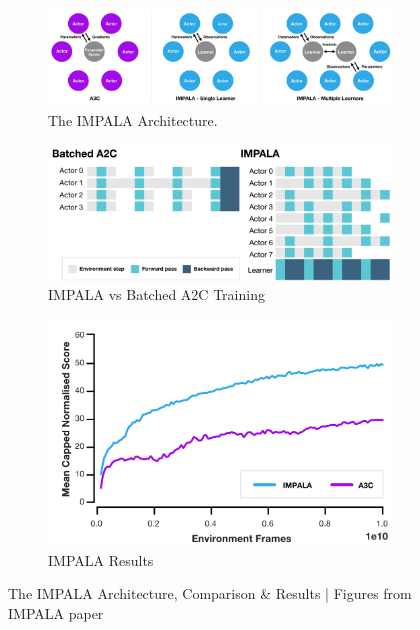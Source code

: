 \begin{figure}[!htb]
	\centering
	\begin{subfigure}[b]{0.45\textwidth}
		\centering
		\includegraphics[width=\textwidth]{figures/algos/impala.png}
		\caption{The IMPALA Architecture.}
		\label{fig:impala_arch}
	\end{subfigure}
	\hfill
	\begin{subfigure}[b]{0.45\textwidth}
		\centering
		\includegraphics[width=\textwidth]{figures/algos/impala_vs_a2c.png}
		\caption{IMPALA vs Batched A2C Training}
		\label{fig:impala_vs_a2c}
	\end{subfigure}
	\hfill

	\begin{subfigure}[b]{0.45\textwidth}
		\centering
		\includegraphics[width=\textwidth]{figures/algos/impala_results.png}
		\caption{IMPALA Results}
		\label{fig:impala_results}
	\end{subfigure}
	\hfill
	\caption{The IMPALA Architecture, Comparison \& Results | Figures from IMPALA paper~\parencite{espeholt2018impala}}
	\label{fig:impala}
\end{figure}



